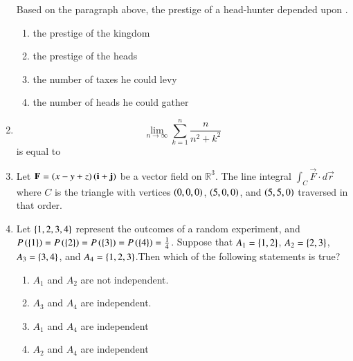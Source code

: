 \documentclass[journal]{IEEEtran}
\begin{document}
\begin{enumerate}
Based on the paragraph above, the prestige of a head-hunter depended upon .\underline{\hspace{1cm}}
\begin{enumerate}
\item the prestige of the kingdom
\item the prestige of the heads
\item the number of taxes he could levy
\item the number of heads he could gather
\end{enumerate}
\item \[\lim_{n \to \infty} \sum_{k=1}^{n} \frac{n}{n^2 + k^2} \] is equal to
\begin{enumerate}
\end{enumerate}
\item Let $\mathbf{F} = \left(x - y + z\right)\left(\mathbf{i} + \mathbf{j}\right)$ be a vector field on $\mathbb{R}^3$. The line integral $\int_C \vec{F} \cdot d\vec{r}$ where $C$ is the triangle with vertices $\left(0,0,0\right)$, $\left(5,0,0\right)$, and $\left(5,5,0\right)$ traversed in that order.
\begin{enumerate}
\end{enumerate}
\item Let $\left\{1,2,3,4\right\}$ represent the outcomes of a random experiment, and $P\left(\left\{1\right\}\right) = P\left(\left\{2\right\}\right) = P\left(\left\{3\right\}\right) = P\left(\left\{4\right\}\right) = \frac{1}{4}$. Suppose that $A_1 = \left\{1,2\right\}$, $A_2 = \left\{2,3\right\}$, $A_3 = \left\{3,4\right\}$, and $A_4 = \left\{1,2,3\right\}$.Then which of the following statements is true?
\begin{enumerate}
\item $A_1$ and $A_2$ are not independent.
\item $A_3$ and $A_4$ are independent.
\item $A_1$ and $A_4$ are independent
\item $A_2$ and $A_4$ are independent
\end{enumerate}
\end{enumerate}
\end{document}
